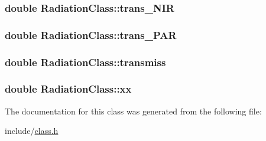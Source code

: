 \subsubsection[{\texorpdfstring{trans\+\_\+\+N\+IR}{trans_NIR}}]{\setlength{\rightskip}{0pt plus 5cm}double Radiation\+Class\+::trans\+\_\+\+N\+IR}\hypertarget{class_radiation_class_a1806d3532dd43f0587cf628ce4c230c1}{}\label{class_radiation_class_a1806d3532dd43f0587cf628ce4c230c1}
\subsubsection[{\texorpdfstring{trans\+\_\+\+P\+AR}{trans_PAR}}]{\setlength{\rightskip}{0pt plus 5cm}double Radiation\+Class\+::trans\+\_\+\+P\+AR}\hypertarget{class_radiation_class_ad859677e3f655775bec7a38754787499}{}\label{class_radiation_class_ad859677e3f655775bec7a38754787499}
\subsubsection[{\texorpdfstring{transmiss}{transmiss}}]{\setlength{\rightskip}{0pt plus 5cm}double Radiation\+Class\+::transmiss}\hypertarget{class_radiation_class_a131eeff6a865f1f5e18d0ce212324e11}{}\label{class_radiation_class_a131eeff6a865f1f5e18d0ce212324e11}
\subsubsection[{\texorpdfstring{xx}{xx}}]{\setlength{\rightskip}{0pt plus 5cm}double Radiation\+Class\+::xx}\hypertarget{class_radiation_class_aa3c9e6cfd66690e7c32e3baea6761f27}{}\label{class_radiation_class_aa3c9e6cfd66690e7c32e3baea6761f27}


The documentation for this class was generated from the following file\+:\begin{DoxyCompactItemize}
\item 
include/\hyperlink{class_8h}{class.\+h}\end{DoxyCompactItemize}
